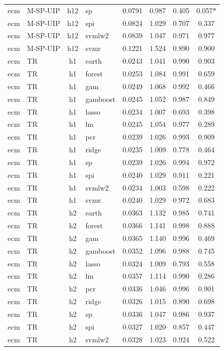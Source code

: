 \begin{ThreePartTable}
\begin{longtable}[t]{llclcccc}
ecm & M-SP-UIP & h12 & sp & 0.0791 & 0.987 & 0.405 & 0.057*\\
ecm & M-SP-UIP & h12 & spi & 0.0824 & 1.029 & 0.707 & 0.337\\
ecm & M-SP-UIP & h12 & svmlw2 & 0.0839 & 1.047 & 0.971 & 0.977\\
ecm & M-SP-UIP & h12 & svmr & 0.1221 & 1.524 & 0.890 & 0.900\\
\addlinespace
ecm & TR & h1 & earth & 0.0243 & 1.041 & 0.990 & 0.903\\
ecm & TR & h1 & forest & 0.0253 & 1.084 & 0.991 & 0.659\\
ecm & TR & h1 & gam & 0.0249 & 1.068 & 0.992 & 0.466\\
ecm & TR & h1 & gamboost & 0.0245 & 1.052 & 0.987 & 0.849\\
ecm & TR & h1 & lasso & 0.0234 & 1.007 & 0.693 & 0.398\\
ecm & TR & h1 & lm & 0.0245 & 1.054 & 0.977 & 0.289\\
ecm & TR & h1 & pcr & 0.0239 & 1.026 & 0.993 & 0.909\\
ecm & TR & h1 & ridge & 0.0235 & 1.009 & 0.778 & 0.464\\
ecm & TR & h1 & sp & 0.0239 & 1.026 & 0.994 & 0.972\\
ecm & TR & h1 & spi & 0.0240 & 1.029 & 0.911 & 0.221\\
ecm & TR & h1 & svmlw2 & 0.0234 & 1.003 & 0.598 & 0.222\\
ecm & TR & h1 & svmr & 0.0240 & 1.029 & 0.972 & 0.683\\
\addlinespace
ecm & TR & h2 & earth & 0.0363 & 1.132 & 0.985 & 0.741\\
ecm & TR & h2 & forest & 0.0366 & 1.141 & 0.998 & 0.888\\
ecm & TR & h2 & gam & 0.0365 & 1.140 & 0.996 & 0.469\\
ecm & TR & h2 & gamboost & 0.0352 & 1.096 & 0.988 & 0.745\\
ecm & TR & h2 & lasso & 0.0324 & 1.009 & 0.793 & 0.558\\
ecm & TR & h2 & lm & 0.0357 & 1.114 & 0.990 & 0.286\\
ecm & TR & h2 & pcr & 0.0336 & 1.046 & 0.996 & 0.901\\
ecm & TR & h2 & ridge & 0.0326 & 1.015 & 0.890 & 0.698\\
ecm & TR & h2 & sp & 0.0336 & 1.047 & 0.986 & 0.937\\
ecm & TR & h2 & spi & 0.0327 & 1.020 & 0.857 & 0.447\\
ecm & TR & h2 & svmlw2 & 0.0328 & 1.023 & 0.924 & 0.522\\

\end{longtable}
\end{ThreePartTable}
